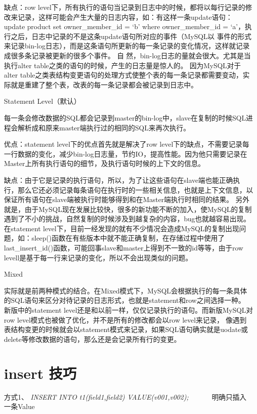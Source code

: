 缺点：row level下，所有执行的语句当记录到日志中的时候，都将以每行记录的修改来记录，这样可能会产生大量的日志内容，如：有这样一条update语句：
update product set owner_member_id = ‘b’ where owner_member_id = ‘a’，执行之后，日志中记录的不是这条update语句所对应的事件（MySQL以 事件的形式来记录bin-log日志），而是这条语句所更新的每一条记录的变化情况，这样就记录成很多条记录被更新的很多个事件。
自 然，bin-log日志的量就会很大。尤其是当执行alter table之类的语句的时候，产生的日志量是惊人的。
因为MySQL对于alter table之类表结构变更语句的处理方式使整个表的每一条记录都需要变动，实际就是重建了整个表，改表的每一条记录都会被记录到日志中。

Statement Level（默认）

每一条会修改数据的SQL都会记录到master的bin-log中，slave在复制的时候SQL进程会解析成和原来master端执行过的相同的SQL来再次执行。

优点：statement level下的优点首先就是解决了row level下的缺点，不需要记录每一行数据的变化，减少bin-log日志量，节约IO，提高性能。因为他只需要记录在Master上所有执行语句的细节，及执行语句时候的上下文的信息。

缺点：由于它是记录的执行语句，所以，为了让这些语句在slave端也能正确执行，那么它还必须记录每条语句在执行时的一些相关信息，也就是上下文信息，以保证所有语句在slave端被执行时能够得到和在Master端执行时相同的结果。
另外就是，由于MySQL现在发展比较快，很多的新功能不断的加入，使MySQL的复制遇到了不小的挑战，自然复制的时候涉及到越复杂的内容，bug也就越容易出现。
在statement level下，目前一经发现的就有不少情况会造成MySQL的复制出现问题，如：sleep()函数在有些版本中就不能正确复制，在存储过程中使用了last_insert_id()函数，可能回事slave和master上得到不一致的id等等，由于row levell是基于每一行来记录的变化，所以不会出现类似的问题。

Mixed

实际就是前两种模式的结合。在Mixed模式下，MySQL会根据执行的每一条具体的SQL语句来区分对待记录的日志形式，也就是statement和row之间选择一种。
新版中的statement level还是和以前一样，仅仅记录执行的语句。而新版MySQL对row level模式也被做了优化，并不是所有的修改都会以row level来记录，
像遇到表结构变更的时候就会以statement模式来记录，如果SQL语句确实就是uodate或delete等修改数据的语句，那么还是会记录所有行的变更。

\section{insert 技巧}
方式1、 \textit{INSERT INTO t1(field1,field2) VALUE(v001,v002);   }    明确只插入一条Value


